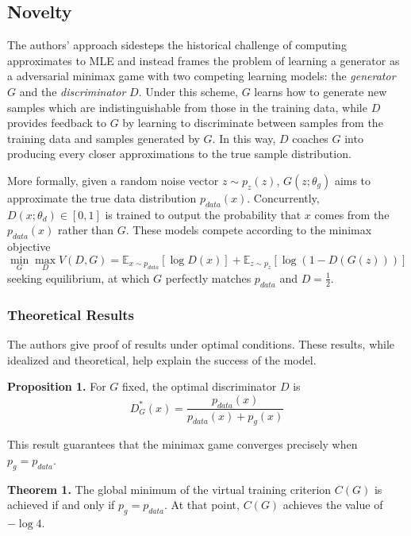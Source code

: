 \documentclass[10pt]{article}
\begin{document}
\subsection*{Novelty}

The authors' approach sidesteps the historical challenge of computing approximates to MLE and instead frames the problem of learning a generator as a adversarial minimax game with two competing learning models: the \textit{generator} \(G\) and the \textit{discriminator} \(D\). Under this scheme, \(G\) learns how to generate new samples which are indistinguishable from those in the training data, while \(D\) provides feedback to \(G\) by learning to discriminate between samples from the training data and samples generated by \(G\). In this way, \(D\) coaches \(G\) into producing every closer approximations to the true sample distribution.

More formally, given a random noise vector \(z \sim p_z(z)\), \(G(z; \theta_g)\) aims to approximate the true data distribution \(p_{data}(x)\). Concurrently, \(D(x; \theta_d) \in [0, 1]\) is trained to output the probability that \(x\) comes from the \(p_{data}(x)\) rather than \(G\). These models compete according to the minimax objective
\[
    \min_G \max_D V(D, G) = \mathbb{E}_{x \sim p_{data}}[\log D(x)] + \mathbb{E}_{z \sim p_z}[\log(1 - D(G(z)))]
\]
seeking equilibrium, at which \(G\) perfectly matches \(p_{data}\) and \(D = \frac{1}{2}\).

\subsubsection*{Theoretical Results}
The authors give proof of results under optimal conditions. These results, while idealized and theoretical, help explain the success of the model.

\vspace{0.5cm}
\noindent
\textbf{Proposition 1.} For \(G\) fixed, the optimal discriminator \(D\) is
\[
    D^*_G(x) = \frac{p_{data}(x)}{p_{data}(x) + p_g(x)}
\]
\vspace{0.5cm}

\noindent
This result guarantees that the minimax game converges precisely when \(p_g = p_{data}\).

\vspace{0.5cm}
\noindent
\textbf{Theorem 1.} The global minimum of the virtual training criterion \(C(G)\) is achieved if and only if \(p_g = p_{data}\). At that point, \(C(G)\) achieves the value of \(-\log 4\).
\end{document}
